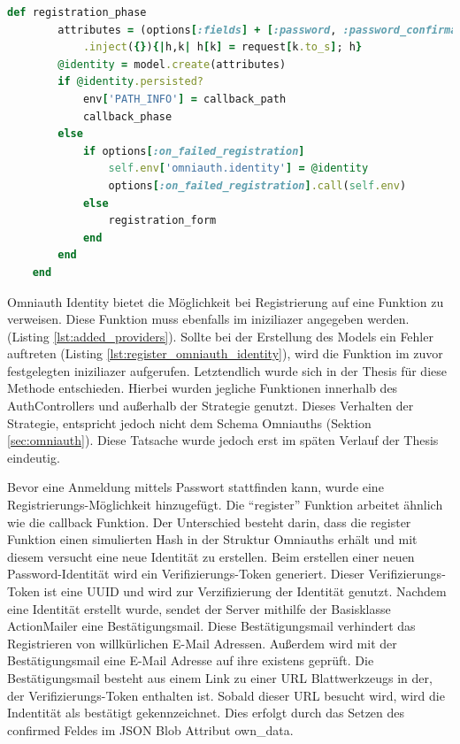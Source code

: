 \documentclass[paper=a4,fontsize=12pt,parskip=half]{scrartcl}
\begin{document}
\begin{description}
		\begin{lstlisting}[language=Ruby, style=CodeView, caption=Aufgerufene Funktion bei POST Request (Omniauth Identity), captionpos=b, label={lst:register_omniauth_identity}]
	def registration_phase
		attributes = (options[:fields] + [:password, :password_confirmation])
			.inject({}){|h,k| h[k] = request[k.to_s]; h}
		@identity = model.create(attributes)
		if @identity.persisted?
			env['PATH_INFO'] = callback_path
			callback_phase
		else
			if options[:on_failed_registration]
				self.env['omniauth.identity'] = @identity
				options[:on_failed_registration].call(self.env)
			else
				registration_form
			end
		end
	end
		\end{lstlisting}
		Omniauth Identity bietet die Möglichkeit bei Registrierung auf eine Funktion zu verweisen. Diese Funktion muss ebenfalls im iniziliazer angegeben werden. (Listing \ref{lst:added_providers}). Sollte bei der Erstellung des Models ein Fehler auftreten (Listing \ref{lst:register_omniauth_identity}), wird die Funktion im zuvor festgelegten iniziliazer aufgerufen. Letztendlich wurde sich in der Thesis für diese Methode entschieden. Hierbei wurden jegliche Funktionen innerhalb des AuthControllers und außerhalb der Strategie genutzt. Dieses Verhalten der Strategie, entspricht jedoch nicht dem Schema Omniauths (Sektion \ref{sec:omniauth}). Diese Tatsache wurde jedoch erst im späten Verlauf der Thesis eindeutig.
		
		Bevor eine Anmeldung mittels Passwort stattfinden kann, wurde eine Registrierungs-Möglichkeit hinzugefügt. Die \enquote{register} Funktion arbeitet ähnlich wie die callback Funktion. Der Unterschied besteht darin, dass die register Funktion einen simulierten Hash in der Struktur Omniauths erhält und mit diesem versucht eine neue Identität zu erstellen. Beim erstellen einer neuen Password-Identität wird ein Verifizierungs-Token generiert. Dieser Verifizierungs-Token ist eine \gls{UUID} und wird zur Verzifizierung der Identität genutzt. Nachdem eine Identität erstellt wurde, sendet der Server mithilfe der Basisklasse ActionMailer eine Bestätigungsmail. Diese Bestätigungsmail verhindert das Registrieren von willkürlichen E-Mail Adressen. Außerdem wird  mit der Bestätigungsmail eine E-Mail Adresse auf ihre existens geprüft. Die Bestätigungsmail besteht aus einem Link zu einer \gls{URL} Blattwerkzeugs in der, der Verifizierungs-Token enthalten ist. Sobald dieser \gls{URL} besucht wird, wird die Indentität als bestätigt gekennzeichnet. Dies erfolgt durch das Setzen des confirmed Feldes im JSON Blob Attribut own\_data.
		

\end{description}
\end{document}
